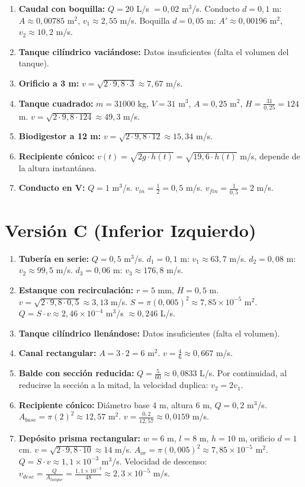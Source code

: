 \documentclass[a4paper,11pt]{article}
\begin{document}
\begin{enumerate}
  \item \textbf{Caudal con boquilla:} $Q=20$ L/s $=0,02$ m$^3$/s. Conducto $d=0,1$ m: $A\approx0,00785$ m$^2$, $v_1\approx2,55$ m/s. Boquilla $d=0,05$ m: $A'\approx0,00196$ m$^2$, $v_2\approx10,2$ m/s.
  \item \textbf{Tanque cilíndrico vaciándose:} Datos insuficientes (falta el volumen del tanque).
  \item \textbf{Orificio a 3 m:} $v=\sqrt{2\cdot9,8\cdot3}\approx7,67$ m/s.
  \item \textbf{Tanque cuadrado:} $m=31000$ kg, $V=31$ m$^3$, $A=0,25$ m$^2$, $H=\frac{31}{0,25}=124$ m. $v=\sqrt{2\cdot9,8\cdot124}\approx49,3$ m/s.
  \item \textbf{Biodigestor a 12 m:} $v=\sqrt{2\cdot9,8\cdot12}\approx15,34$ m/s.
  \item \textbf{Recipiente cónico:} $v(t)=\sqrt{2g\cdot h(t)}=\sqrt{19,6\cdot h(t)}$ m/s, depende de la altura instantánea.
  \item \textbf{Conducto en V:} $Q=1$ m$^3$/s. $v_{in}=\frac{1}{2}=0,5$ m/s. $v_{fin}=\frac{1}{0,5}=2$ m/s.
\end{enumerate}

\newpage

\section*{Versión C (Inferior Izquierdo)}

\begin{enumerate}
  \item \textbf{Tubería en serie:} $Q=0,5$ m$^3$/s. $d_1=0,1$ m: $v_1\approx63,7$ m/s. $d_2=0,08$ m: $v_2\approx99,5$ m/s. $d_3=0,06$ m: $v_3\approx176,8$ m/s.
  \item \textbf{Estanque con recirculación:} $r=5$ mm, $H=0,5$ m. $v=\sqrt{2\cdot9,8\cdot0,5}\approx3,13$ m/s. $S=\pi(0,005)^2\approx7,85\times10^{-5}$ m$^2$. $Q=S\cdot v\approx2,46\times10^{-4}$ m$^3$/s $\approx0,246$ L/s.
  \item \textbf{Tanque cilíndrico llenándose:} Datos insuficientes (falta el volumen).
  \item \textbf{Canal rectangular:} $A=3\cdot2=6$ m$^2$. $v=\frac{4}{6}\approx0,667$ m/s.
  \item \textbf{Balde con sección reducida:} $Q=\frac{5}{60}\approx0,0833$ L/s. Por continuidad, al reducirse la sección a la mitad, la velocidad duplica: $v_2=2v_1$.
  \item \textbf{Recipiente cónico:} Diámetro base 4 m, altura 6 m, $Q=0,2$ m$^3$/s. $A_{base}=\pi(2)^2\approx12,57$ m$^2$. $v=\frac{0,2}{12,57}\approx0,0159$ m/s.
  \item \textbf{Depósito prisma rectangular:} $w=6$ m, $l=8$ m, $h=10$ m, orificio $d=1$ cm. $v=\sqrt{2\cdot9,8\cdot10}\approx14$ m/s. $A_{or}=\pi(0,005)^2\approx7,85\times10^{-5}$ m$^2$. $Q=S\cdot v\approx1,1\times10^{-3}$ m$^3$/s. Velocidad de descenso: $v_{desc}=\frac{Q}{A_{tanque}}=\frac{1,1\times10^{-3}}{48}\approx2,3\times10^{-5}$ m/s.
\end{enumerate}
\end{document}
